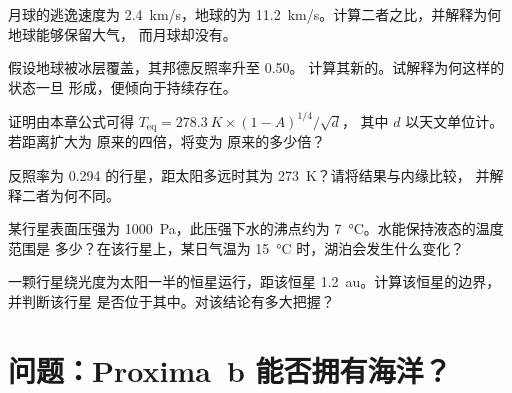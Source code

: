 \begin{exercise}[$\star\star$]\label{exo:g10:habitable-planet:10}
月球的逃逸速度为 \qty{2.4}{km/s}，地球的为
\qty{11.2}{km/s}。计算二者之比，并解释为何地球能够保留大气，
而月球却没有。
\end{exercise}

\begin{exercise}[$\star\star$]\label{exo:g10:habitable-planet:11}
假设地球被冰层覆盖，其邦德反照率升至 0.50。
计算其新的。试解释为何这样的状态一旦
形成，便倾向于持续存在。
\end{exercise}

\begin{exercise}[$\star\star\star$]\label{exo:g10:habitable-planet:12}
证明由本章公式可得 $T_{\mathrm{eq}} = \qty{278.3}{K} \times (1-A)^{1/4}/\sqrt{d}$，
其中 $d$ 以天文单位计。若距离扩大为
原来的四倍，将变为
原来的多少倍？
\end{exercise}

\begin{exercise}[$\star\star\star$]\label{exo:g10:habitable-planet:13}
反照率为 0.294 的行星，距太阳多远时其为
\qty{273}{K}？请将结果与内缘比较，
并解释二者为何不同。
\end{exercise}

\begin{exercise}[$\star\star\star$]\label{exo:g10:habitable-planet:14}
某行星表面压强为 \qty{1000}{Pa}，此压强下水的沸点约为
\qty{7}{\degreeCelsius}。水能保持液态的温度范围是
多少？在该行星上，某日气温为
\qty{15}{\degreeCelsius} 时，湖泊会发生什么变化？
\end{exercise}

\begin{exercise}[$\star\star\star$]\label{exo:g10:habitable-planet:15}
一颗行星绕光度为太阳一半的恒星运行，距该恒星
\qty{1.2}{au}。计算该恒星的边界，并判断该行星
是否位于其中。对该结论有多大把握？
\end{exercise}

\section{问题：Proxima~b 能否拥有海洋？}


